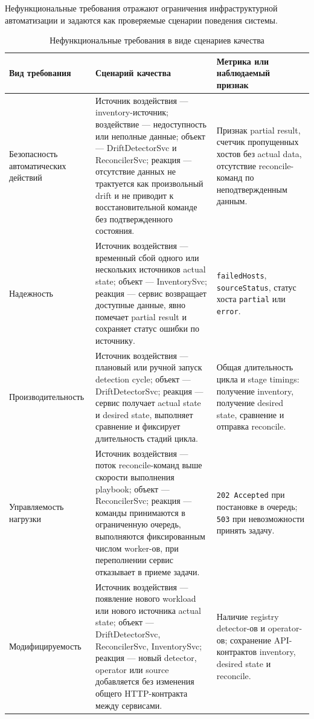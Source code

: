 Нефункциональные требования отражают ограничения инфраструктурной автоматизации и задаются как проверяемые сценарии поведения системы.

\clearpage

\begingroup
    \footnotesize
    \begin{longtable}{|p{}|p{}|p{}|}\caption{Нефункциональные требования в виде сценариев качества}
    \label{tab:ch2-nonfunctional-requirements}\\ \hline
    Вид требования & Сценарий качества & Метрика или наблюдаемый признак \\ \hline
    Безопасность автоматических действий & Источник воздействия --- inventory-источник; воздействие --- недоступность или неполные данные; объект --- DriftDetectorSvc и ReconcilerSvc; реакция --- отсутствие данных не трактуется как произвольный drift и не приводит к восстановительной команде без подтвержденного состояния. & Признак partial result, счетчик пропущенных хостов без actual data, отсутствие reconcile-команд по неподтвержденным данным. \\ \hline
    Надежность & Источник воздействия --- временный сбой одного или нескольких источников actual state; объект --- InventorySvc; реакция --- сервис возвращает доступные данные, явно помечает partial result и сохраняет статус ошибки по источнику. & \texttt{failedHosts}, \texttt{sourceStatus}, статус хоста \texttt{partial} или \texttt{error}. \\ \hline
    Производительность & Источник воздействия --- плановый или ручной запуск detection cycle; объект --- DriftDetectorSvc; реакция --- сервис получает actual state и desired state, выполняет сравнение и фиксирует длительность стадий цикла. & Общая длительность цикла и stage timings: получение inventory, получение desired state, сравнение и отправка reconcile. \\ \hline
    Управляемость нагрузки & Источник воздействия --- поток reconcile-команд выше скорости выполнения playbook; объект --- ReconcilerSvc; реакция --- команды принимаются в ограниченную очередь, выполняются фиксированным числом worker-ов, при переполнении сервис отказывает в приеме задачи. & \texttt{202 Accepted} при постановке в очередь; \texttt{503} при невозможности принять задачу. \\ \hline
    Модифицируемость & Источник воздействия --- появление нового workload или нового источника actual state; объект --- DriftDetectorSvc, ReconcilerSvc, InventorySvc; реакция --- новый detector, operator или source добавляется без изменения общего HTTP-контракта между сервисами. & Наличие registry detector-ов и operator-ов; сохранение API-контрактов inventory, desired state и reconcile. \\ \hline

\end{longtable}
